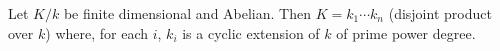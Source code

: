 Let $K/k$ be finite dimensional and Abelian. Then $K = k_1 \cdots k_n$ (disjoint product over $k$) where, for each $i$, $k_i$ is a cyclic extension of $k$ of prime power degree.
